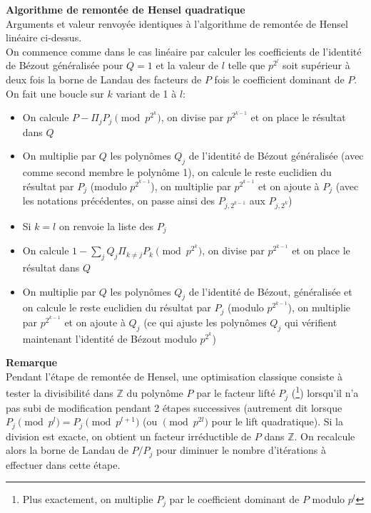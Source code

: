 \documentclass[a4paper,11pt]{article}
\newcommand{\Z}{{\mathbb{Z}}}
\begin{document}
\begin{giacjshere}
{\bf Algorithme de remontée de Hensel quadratique}\\
Arguments et valeur renvoyée identiques à l'algorithme de remontée de Hensel
linéaire ci-dessus.\\
On commence comme dans le cas linéaire par calculer les coefficients
de l'identité de Bézout généralisée pour $Q=1$ et la valeur de $l$ telle
que $p^{2^l}$ soit supérieur à deux fois la borne de Landau des facteurs
de $P$ fois le coefficient dominant de $P$.\\
On fait une boucle sur $k$ variant de 1 à $l$:
\begin{itemize}
\item On calcule $P-\Pi_j P_j \pmod {p^{2^k}}$, on divise par $p^{2^{k-1}}$
et on place le résultat dans $Q$
\item On multiplie par $Q$ les polynômes $Q_j$ de l'identité de Bézout
généralisée (avec comme second membre le polynôme 1),
on calcule le reste euclidien du résultat par $P_j$ (modulo $p^{2^{k-1}}$), 
on multiplie par $p^{2^{k-1}}$ et on ajoute à $P_j$ (avec les notations
précédentes, on passe ainsi des $P_{j,2^{k-1}}$ aux $P_{j,2^k}$)
\item Si $k=l$ on renvoie la liste des $P_j$
\item On calcule $1-\sum_j Q_j \Pi_{k\neq j} P_k \pmod {p^{2^k}}$, on
divise par $p^{2^{k-1}}$ et on place le résultat dans $Q$
\item On multiplie par $Q$ les polynômes $Q_j$ de l'identité de Bézout,
généralisée et on calcule le reste euclidien du résultat par 
$P_j$ (modulo $p^{2^{k-1}}$), on multiplie par $p^{2^{k-1}}$ et 
on ajoute à $Q_j$ (ce qui ajuste les polynômes $Q_j$ qui vérifient
maintenant l'identité de Bézout modulo $p^{2^k}$)
\end{itemize}

{\bf Remarque}\\
Pendant l'étape de remontée de Hensel, une optimisation classique
consiste à tester la divisibilité dans $\Z$ du polynôme $P$ par le 
facteur lifté $P_j$ (\footnote{Plus exactement, on multiplie $P_j$ par le
coefficient dominant de $P$ modulo $p^l$})
lorsqu'il n'a pas subi de modification pendant 2 étapes successives
(autrement dit lorsque $P_j \pmod {p^l}=P_j \pmod {p^{l+1}}$ (ou
$\pmod {p^{2l}}$ pour le lift quadratique). Si la division
est exacte, on obtient un facteur irréductible de $P$ dans $\Z$.
On recalcule alors la borne de Landau de $P/P_j$ pour diminuer
le nombre d'itérations à effectuer dans cette étape.


\end{giacjshere}
\end{document}
